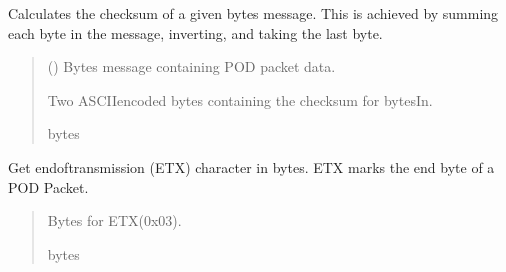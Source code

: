 \documentclass[letterpaper,10pt,english]{sphinxmanual}
\begin{document}
\begin{fulllineitems}
\begin{fulllineitems}
\label{\detokenize{PodPacketHandling:PodPacketHandling.POD_Packets.Checksum}}
\pysigstartsignatures
{}
\pysigstopsignatures
\sphinxAtStartPar
Calculates the checksum of a given bytes message. This is achieved by summing each byte in the         message, inverting, and taking the last byte.
\begin{quote}\begin{description}
\sphinxAtStartPar
{} () \textendash{} Bytes message containing POD packet data.

\sphinxAtStartPar
Two ASCII\sphinxhyphen{}encoded bytes containing the checksum for bytesIn.

\sphinxAtStartPar
bytes

\end{description}\end{quote}

\end{fulllineitems}


\begin{fulllineitems}
\label{\detokenize{PodPacketHandling:PodPacketHandling.POD_Packets.ETX}}
\pysigstartsignatures
{}
\pysigstopsignatures
\sphinxAtStartPar
Get end\sphinxhyphen{}of\sphinxhyphen{}transmission (ETX) character in bytes. ETX marks the end byte of a POD Packet.
\begin{quote}\begin{description}
\sphinxAtStartPar
Bytes for ETX(0x03).

\sphinxAtStartPar
bytes

\end{description}\end{quote}

\end{fulllineitems}


\end{fulllineitems}
\end{document}

